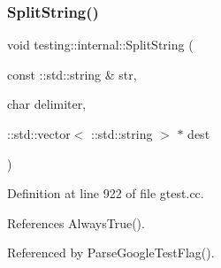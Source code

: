 \subsubsection{\texorpdfstring{Split\+String()}{SplitString()}}
{\footnotesize\ttfamily void testing\+::internal\+::\+Split\+String (\begin{DoxyParamCaption}\item[{const \+::std\+::string \&}]{str,  }\item[{char}]{delimiter,  }\item[{\+::std\+::vector$<$ \+::std\+::string $>$ $\ast$}]{dest }\end{DoxyParamCaption})}



Definition at line 922 of file gtest.\+cc.



References Always\+True().



Referenced by Parse\+Google\+Test\+Flag().


